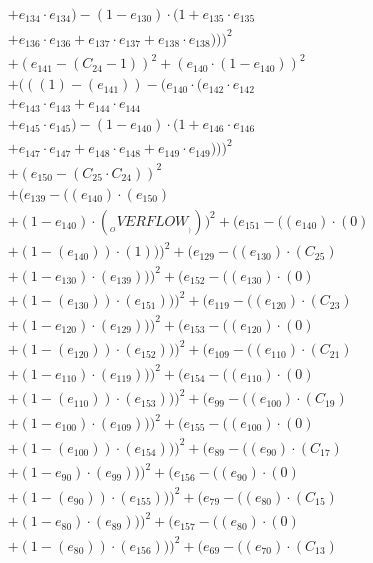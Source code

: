 \documentclass[10pt, a4paper]{article}
\begin{document}
\begin{small}
\begin{align*}
& + e_{134} \cdot e_{134}) - (1 - e_{130}) \cdot (1 + e_{135} \cdot e_{135} \\
& + e_{136} \cdot e_{136} + e_{137} \cdot e_{137} + e_{138} \cdot e_{138})))^{2} \\
& + (e_{141} - (C_{24} - 1))^{2} + (e_{140} \cdot (1 - e_{140}))^{2} \\
& + (((1) - (e_{141})) - (e_{140} \cdot (e_{142} \cdot e_{142} \\
& + e_{143} \cdot e_{143} + e_{144} \cdot e_{144} \\
& + e_{145} \cdot e_{145}) - (1 - e_{140}) \cdot (1 + e_{146} \cdot e_{146} \\
& + e_{147} \cdot e_{147} + e_{148} \cdot e_{148} + e_{149} \cdot e_{149})))^{2} \\
& + (e_{150} - (C_{25}  \cdot  C_{24}))^{2} \\
& + (e_{139} - ((e_{140})  \cdot  (e_{150}) \\
& + (1 - e_{140})  \cdot  (__OVERFLOW__)))^{2} + (e_{151} - ((e_{140}) \cdot (0) \\
& + (1 - (e_{140})) \cdot (1)))^{2} + (e_{129} - ((e_{130})  \cdot  (C_{25}) \\
& + (1 - e_{130})  \cdot  (e_{139})))^{2} + (e_{152} - ((e_{130}) \cdot (0) \\
& + (1 - (e_{130})) \cdot (e_{151})))^{2} + (e_{119} - ((e_{120})  \cdot  (C_{23}) \\
& + (1 - e_{120})  \cdot  (e_{129})))^{2} + (e_{153} - ((e_{120}) \cdot (0) \\
& + (1 - (e_{120})) \cdot (e_{152})))^{2} + (e_{109} - ((e_{110})  \cdot  (C_{21}) \\
& + (1 - e_{110})  \cdot  (e_{119})))^{2} + (e_{154} - ((e_{110}) \cdot (0) \\
& + (1 - (e_{110})) \cdot (e_{153})))^{2} + (e_{99} - ((e_{100})  \cdot  (C_{19}) \\
& + (1 - e_{100})  \cdot  (e_{109})))^{2} + (e_{155} - ((e_{100}) \cdot (0) \\
& + (1 - (e_{100})) \cdot (e_{154})))^{2} + (e_{89} - ((e_{90})  \cdot  (C_{17}) \\
& + (1 - e_{90})  \cdot  (e_{99})))^{2} + (e_{156} - ((e_{90}) \cdot (0) \\
& + (1 - (e_{90})) \cdot (e_{155})))^{2} + (e_{79} - ((e_{80})  \cdot  (C_{15}) \\
& + (1 - e_{80})  \cdot  (e_{89})))^{2} + (e_{157} - ((e_{80}) \cdot (0) \\
& + (1 - (e_{80})) \cdot (e_{156})))^{2} + (e_{69} - ((e_{70})  \cdot  (C_{13}) \\

\end{align*}
\end{small}
\end{document}
